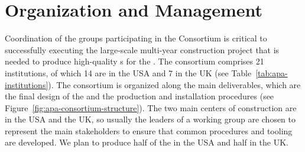 \section{Organization and Management}
\label{sec:fdsp-apa-org}

Coordination of the groups participating in the   Consortium is critical to successfully executing the large-scale multi-year construction project that is needed to produce high-quality s for the  .   The  consortium comprises \num{21} institutions, of which \num{14} are in the USA and \num{7} in the UK (see Table~\ref{tab:apa-institutions}). The consortium is organized along the main deliverables, which are the final design of the  and the  production and installation procedures (see Figure~\ref{fig:apa-consortium-structure}).  The two main centers of  construction are in the USA and the UK, so usually the leaders of a working group are chosen to represent the main stakeholders to ensure that common procedures and tooling are developed.  We plan to produce half of the   in the USA and half in the UK.

